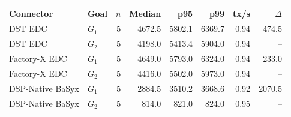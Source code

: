 \begin{tabular}{llrrrrrr}
    \toprule
    Connector & Goal & $n$ & Median & p95 & p99 & tx/s & $\Delta$ \\
    \midrule
    DST EDC & $G_1$ & 5 & 4672.5 & 5802.1 & 6369.7 & 0.94 & 474.5 \\
    DST EDC & $G_2$ & 5 & 4198.0 & 5413.4 & 5904.0 & 0.94 & -- \\
    Factory-X EDC & $G_1$ & 5 & 4649.0 & 5793.0 & 6324.0 & 0.94 & 233.0 \\
    Factory-X EDC & $G_2$ & 5 & 4416.0 & 5502.0 & 5973.0 & 0.94 & -- \\
    DSP-Native BaSyx & $G_1$ & 5 & 2884.5 & 3510.2 & 3668.6 & 0.92 & 2070.5 \\
    DSP-Native BaSyx & $G_2$ & 5 & 814.0 & 821.0 & 824.0 & 0.95 & -- \\
    \bottomrule
\end{tabular}
